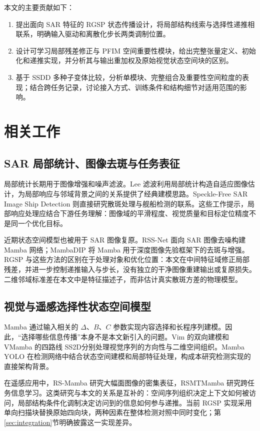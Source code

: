 \documentclass[UTF8,11pt,a4paper,fontset=fandol]{ctexart}
\begin{document}
本文的主要贡献如下：
\begin{enumerate}
\item 提出面向 SAR 特征的 RGSP 状态传播设计，将局部结构线索与选择性递推相联系，明确输入驱动和离散化步长两类调制位置。
\item 设计可学习局部残差修正与 PFIM 空间重要性模块，给出完整张量定义、初始化和递推实现，并分析其与输出重加权及原始视觉状态空间块的区别。
\item 基于 SSDD 多种子变体比较，分析单模块、完整组合及重要性空间粒度的表现；结合跨任务记录，讨论接入方式、训练条件和结构细节对适用范围的影响。
\end{enumerate}

\section{相关工作}\label{sec:related}
\subsection{SAR 局部统计、图像去斑与任务表征}
局部统计长期用于图像增强和噪声滤波。Lee 滤波利用局部统计构造自适应图像估计，为局部响应与邻域背景之间的关系提供了经典建模思路\cite{lee1980}。Speckle-Free SAR Image Ship Detection 则直接研究散斑处理与舰船检测的联系\cite{specklefree2021}。这些工作提示，局部响应处理应结合下游任务理解：图像域的平滑程度、视觉质量和目标定位精度不是同一个优化目标。

近期状态空间模型也被用于 SAR 图像复原。RSS-Net 面向 SAR 图像去噪构建 Mamba 网络\cite{rssnet2026}；MambaDIP 将 Mamba 用于深度图像先验框架下的去斑与增强\cite{mambadip2026}。RGSP 与这些方法的区别在于处理对象和优化位置：本文在中间特征域修正局部残差，并进一步控制递推输入与步长，没有独立的干净图像重建输出或复原损失。二维邻域标准差在本文中是特征描述子，而非估计真实散斑方差的物理模型。

\subsection{视觉与遥感选择性状态空间模型}
Mamba 通过输入相关的 $\Delta$、$B$、$C$ 参数实现内容选择和长程序列建模\cite{mamba2023}。因此，“选择哪些信息传播”本身不是本文新引入的问题。Vim 的双向建模\cite{vim2024}和 VMamba 的四路线 SS2D\cite{vmamba2024}分别处理视觉序列的方向性与二维空间组织。Mamba YOLO 在检测网络中结合状态空间建模和局部特征处理\cite{mambayolo2024}，构成本研究检测实现的直接架构背景。

在遥感应用中，RS-Mamba 研究大幅面图像的密集表征\cite{rsmamba2024}，RSMTMamba 研究跨任务信息学习\cite{rstmtmamba2025}。这类研究与本文的关系是互补的：空间序列组织决定上下文如何被访问，局部结构条件化调制决定访问到的信息如何参与递推。当前 RGSP 实现采用单向扫描块替换原始四向块，两种因素在整体检测对照中同时变化；第\ref{sec:integration}节明确披露这一实现差异。
\end{document}
